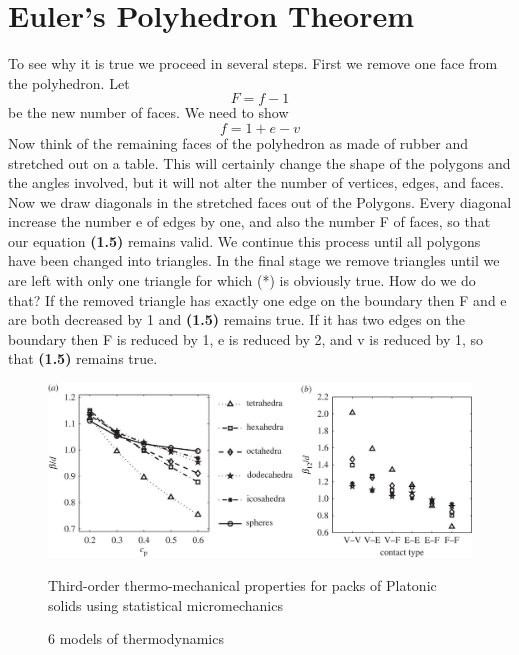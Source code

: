\documentclass[openany,a4paper,12pt]{book}
\begin{document}
\section{Euler's Polyhedron Theorem}
To see why it is true we proceed in several steps. First we remove one face from the polyhedron. Let
\begin {equation}
F=f-1
\end {equation}
be the new number of faces. We need to show
\begin {equation}
f=1+e-v
\end {equation}
Now think of the remaining faces of the polyhedron as made of rubber and stretched out on a table. This will certainly change the shape of the polygons and the angles involved, but it will not alter the number of vertices, edges, and faces. Now we draw diagonals in the stretched faces out of the Polygons. Every diagonal increase the number e of edges by one, and also the number F of faces, so that our equation \textbf{(1.5)} remains valid. We continue this process until all polygons have been changed into triangles. \newline \newline
In the final stage we remove triangles until we are left with only one triangle for which (*) is obviously true. How do we do that? If the removed triangle has exactly one edge on the boundary then F and e are both decreased by 1 and \textbf{(1.5)} remains true. If it has two edges on the boundary then F is reduced by 1, e is reduced by 2, and v is reduced by 1, so that \textbf{(1.5)} remains true.
\begin{center}

\begin{figure}[ht]
\begin{center}
\includegraphics[width=13cm]{picture1.jpg} \caption{6 models of thermodynamics}{Third-order thermo-mechanical properties for packs of Platonic solids using statistical micromechanics} \label{rys1}
\end{center}
\end{figure}
\end{center}
\end{document}
